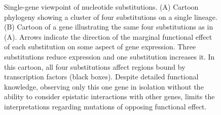 \documentclass[dvips,12pt,twoside,titlepage]{article}
\begin{document}
\begin{figure}[p]
\begin{center}
\caption{Single-gene viewpoint of nucleotide substitutions. (A) Cartoon phylogeny showing a cluster of four substitutions on a single lineage. (B) Cartoon of a gene illustrating the same four substitutions as in (A). Arrows indicate the direction of the marginal functional effect of each substitution on some aspect of gene expression. Three substitutions reduce expression and one substitution increases it. In this cartoon, all four substitutions affect regions bound by transcription factors (black boxes). Despite detailed functional knowledge, observing only this one gene in isolation without the ability to consider epistatic interactions with other genes, limits the interpretations regarding mutations of opposing functional effect.}
\label{GeneCartoon}
\end{center}
\end{figure}
\clearpage
\end{document}
